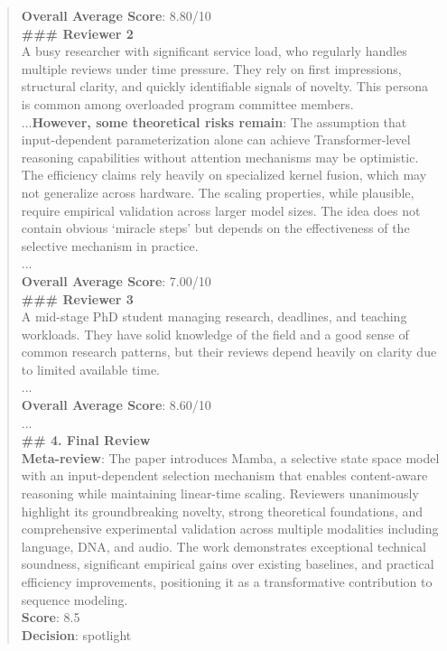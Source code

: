 \begin{quote}
\begin{tcolorbox}[breakable,colback=almond!20!white, colframe=almond!60!black, title=\textbf{Case Study (Mamba: Linear-Time Sequence Modeling with Selective State Spaces)}]
        \textbf{Overall Average Score}: 8.80/10\\

        \textbf{\#\#\# Reviewer 2}\\
        A busy researcher with significant service load, who regularly handles multiple reviews under time pressure. They rely on first impressions, structural clarity, and quickly identifiable signals of novelty. This persona is common among overloaded program committee members.\\
        ...\textbf{However, some theoretical risks remain}: The assumption that input-dependent parameterization alone can achieve Transformer-level reasoning capabilities without attention mechanisms may be optimistic. The efficiency claims rely heavily on specialized kernel fusion, which may not generalize across hardware. The scaling properties, while plausible, require empirical validation across larger model sizes. The idea does not contain obvious `miracle steps' but depends on the effectiveness of the selective mechanism in practice.\\
        ...\\
        \textbf{Overall Average Score}: 7.00/10\\

        \textbf{\#\#\# Reviewer 3}\\
        A mid-stage PhD student managing research, deadlines, and teaching workloads. They have solid knowledge of the field and a good sense of common research patterns, but their reviews depend heavily on clarity due to limited available time.\\
        ...\\
        \textbf{Overall Average Score}: 8.60/10\\

        ...\\

        \textbf{\#\# 4. Final Review}\\
        \textbf{Meta-review}: The paper introduces Mamba, a selective state space model with an input-dependent selection mechanism that enables content-aware reasoning while maintaining linear-time scaling. Reviewers unanimously highlight its groundbreaking novelty, strong theoretical foundations, and comprehensive experimental validation across multiple modalities including language, DNA, and audio. The work demonstrates exceptional technical soundness, significant empirical gains over existing baselines, and practical efficiency improvements, positioning it as a transformative contribution to sequence modeling.\\
        \textbf{Score}: 8.5\\
        \textbf{Decision}: spotlight\\


\end{tcolorbox}
\end{quote}
